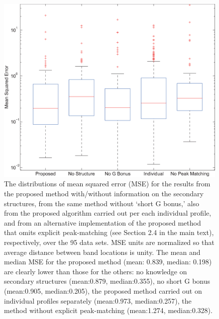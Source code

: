 \documentclass[letter]{bioinfo}
\newcommand{\hilightcolor}{red}
\newcommand{\hilight}[1]{{\color{\hilightcolor}#1}}
\begin{document}
\begin{figure}
\centering
\includegraphics[width=0.95\linewidth]{figures/supp_old_new_comparison3}
\caption{The distributions of mean squared error (MSE) for the results from the proposed method \hilight{with/without information on the secondary structures, from the same method without `short G bonus,' also from the proposed algorithm carried out per each individual profile, and from an alternative implementation of the proposed method that omits explicit peak-matching (see Section 2.4 in the main text), respectively, over the 95 data sets. MSE units are normalized so that average distance between band locations is unity. The mean and median MSE for the proposed method (mean: 0.839, median: 0.198) are clearly lower than those for the others: no knowledge on secondary structures (mean:0.879, median:0.355), no short G bonus (mean:0.905, median:0.205), the proposed method carried out on individual profiles separately (mean:0.973, median:0.257), the method without explicit peak-matching (mean:1.274, median:0.328).}}
\label{f:old_vs_new}
\end{figure}
\end{document}
